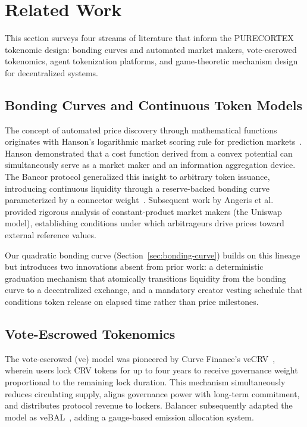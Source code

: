 \section{Related Work}
\label{sec:related-work}

This section surveys four streams of literature that inform the PURECORTEX
tokenomic design: bonding curves and automated market makers, vote-escrowed
tokenomics, agent tokenization platforms, and game-theoretic mechanism design
for decentralized systems.

\subsection{Bonding Curves and Continuous Token Models}
\label{subsec:rw-bonding}

The concept of automated price discovery through mathematical functions
originates with Hanson's logarithmic market scoring rule for prediction
markets~\citep{hanson2003combinatorial}. Hanson demonstrated that a cost
function derived from a convex potential can simultaneously serve as a market
maker and an information aggregation device. The Bancor protocol generalized
this insight to arbitrary token issuance, introducing continuous liquidity
through a reserve-backed bonding curve parameterized by a connector
weight~\citep{bancor2017}. Subsequent work by Angeris et
al.~\citep{angeris2020improved} provided rigorous analysis of constant-product
market makers (the Uniswap model), establishing conditions under which
arbitrageurs drive prices toward external reference values.

Our quadratic bonding curve (Section~\ref{sec:bonding-curve}) builds on this
lineage but introduces two innovations absent from prior work: a deterministic
graduation mechanism that atomically transitions liquidity from the bonding
curve to a decentralized exchange, and a mandatory creator vesting schedule
that conditions token release on elapsed time rather than price milestones.

\subsection{Vote-Escrowed Tokenomics}
\label{subsec:rw-ve}

The vote-escrowed (ve) model was pioneered by Curve Finance's
veCRV~\citep{curvefinance2020, egorov2019stableswap}, wherein users lock CRV
tokens for up to four years to receive governance weight proportional to the
remaining lock duration. This mechanism simultaneously reduces circulating
supply, aligns governance power with long-term commitment, and distributes
protocol revenue to lockers. Balancer subsequently adapted the model as
veBAL~\citep{balancer2022vebal}, adding a gauge-based emission allocation
system.


